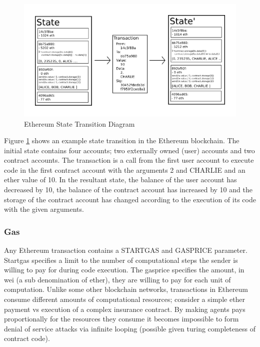 \begin{figure}
\centering
\includegraphics[width=\textwidth]{Figures/ethereum_transition}
\decoRule
\caption[Ethereum State Transition Diagram]{Ethereum State Transition Diagram}
\label{fig:ethereum_transition}
\end{figure}

Figure \ref{fig:ethereum_transition} shows an example state transition in the Ethereum blockchain. The initial state contains four accounts; two externally owned (user) accounts and two contract accounts. The transaction is a call from the first user account to execute code in the first contract account with the arguments 2 and CHARLIE and an ether value of 10. In the resultant state, the balance of the user account has decreased by 10, the balance of the contract account has increased by 10 and the storage of the contract account has changed according to the execution of its code with the given arguments.\\

\subsubsection{Gas}
Any Ethereum transaction contains a STARTGAS and GASPRICE parameter. Startgas specifies a limit to the number of computational steps the sender is willing to pay for during code execution. The gasprice specifies the amount, in wei (a sub denomination of ether), they are willing to pay for each unit of computation. Unlike some other blockchain networks, transactions in Ethereum consume different amounts of computational resources; consider a simple ether payment vs execution of a complex insurance contract. By making agents pays proportionally for the resources they consume it becomes impossible to form denial of service attacks via infinite looping (possible given turing completeness of contract code). \\

